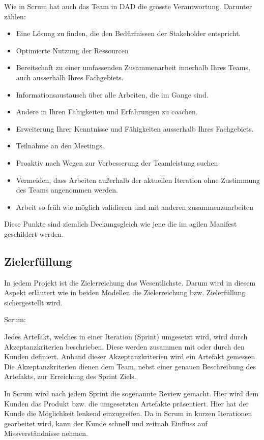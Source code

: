 Wie in Scrum hat auch das Team in DAD die grösste Verantwortung. Darunter zählen:

\begin{itemize}
	\item Eine Lösung zu finden, die den Bedürfnissen der Stakeholder entspricht.
	\item Optimierte Nutzung der Ressourcen
	\item Bereitschaft zu einer umfassenden Zusammenarbeit innerhalb Ihres Teams, auch ausserhalb Ihres Fachgebiets.
	\item Informationsaustausch über alle Arbeiten, die im Gange sind.
	\item Andere in Ihren Fähigkeiten und Erfahrungen zu coachen.
	\item Erweiterung Ihrer Kenntnisse und Fähigkeiten ausserhalb Ihres Fachgebiets.
	\item Teilnahme an den Meetings.
	\item Proaktiv nach Wegen zur Verbesserung der Teamleistung suchen
	\item Vermeiden, dass Arbeiten außerhalb der aktuellen Iteration ohne Zustimmung des Teams angenommen werden.
	\item Arbeit so früh wie möglich validieren und mit anderen zusammenzuarbeiten
\end{itemize}

Diese Punkte sind ziemlich Deckungsgleich wie jene die im agilen Manifest geschildert werden. 

\subsection{Zielerfüllung}

In jedem Projekt ist die Zielerreichung das Wesentlichste. Darum wird in diesem Aspekt erläutert wie in beiden Modellen die Zielerreichung bzw. Zielerfüllung sichergestellt wird.

\medskip
{\Large Scrum:}\cite{scrumAC} \medskip

Jedes Artefakt, welches in einer Iteration (Sprint) umgesetzt wird, wird durch Akzeptanzkriterien beschrieben. Diese werden zusammen mit oder durch den Kunden definiert. Anhand dieser Akzeptanzkriterien wird ein Artefakt gemessen. Die Akzeptanzkriterien dienen dem Team, nebst einer genauen Beschreibung des Artefakts, zur Erreichung des Sprint Ziels.

In Scrum wird nach jedem Sprint die sogenannte Review gemacht. Hier wird dem Kunden das Produkt bzw. die umgesetzten Artefakte präsentiert. Hier hat der Kunde die Möglichkeit lenkend einzugreifen. Da in Scrum in kurzen Iterationen gearbeitet wird, kann der Kunde schnell und zeitnah Einfluss auf Missverständnisse nehmen.

